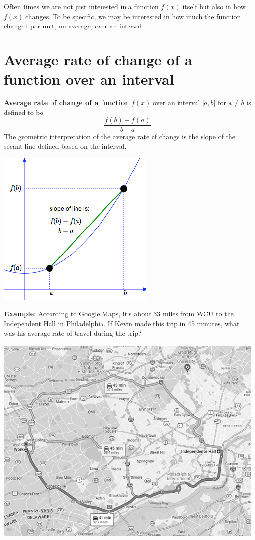 \documentclass[
]{book}
\begin{document}
Often times we are not just interested in a function \(f(x)\) itself but also in how \(f(x)\) changes. To be specific, we may be interested in how much the function changed per unit, on average, over an interval.

\hypertarget{average-rate-of-change-of-a-function-over-an-interval-1}{%
\section{Average rate of change of a function over an interval}\label{average-rate-of-change-of-a-function-over-an-interval-1}}

\textbf{Average rate of change of a function} \(f(x)\) over an interval {[}\(a, b\){]} for \(a \ne b\) is defined to be \[
\frac{f(b)-f(a)}{b-a}
\] The geometric interpretation of the average rate of change is the slope of the secant line defined based on the interval.

\begin{center}\includegraphics[width=0.45\linewidth]{img01/w01note16-SecantLineSlope} \end{center}

\textbf{Example}: According to Google Maps, it's about 33 miles from WCU to the Independent Hall in Philadelphia. If Kevin made this trip in 45 minutes, what was his average rate of travel during the trip?

\begin{center}\includegraphics[width=0.65\linewidth]{img01/w01note17-RateChangeDistance} \end{center}
\end{document}
